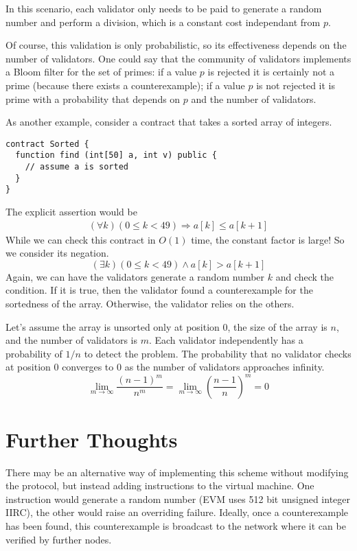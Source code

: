 \documentclass{article}
\begin{document}
In this scenario, each validator only needs to be paid to generate a random number and
perform a division, which is a constant cost independant from $p$.

Of course, this validation is only probabilistic, so its effectiveness depends on the
number of validators. One could say that the community of validators implements a Bloom
filter for the set of primes: if a value $p$ is rejected it is certainly not a prime (because
there exists a counterexample); if a value $p$ is not rejected it is prime with a
probability that depends on $p$ and the number of validators. 

As another example, consider a contract that takes a sorted array of integers.
\begin{lstlisting}[numbers=none]
contract Sorted {
  function find (int[50] a, int v) public {
    // assume a is sorted
  }
}
\end{lstlisting}
The explicit assertion would be
\begin{gather}\label{eq:1}
  (\forall k) (0\le k <49) \Rightarrow a[k] \le a[k+1]
\end{gather}
While we can check this contract in $O(1)$ time, the constant factor is large! So we
consider its negation.
\begin{displaymath}
  (\exists k) (0\le k <49) \wedge a[k] > a[k+1]
\end{displaymath}
Again, we can have the validators generate a random number $k$ and check the
condition. If it is true, then the validator found a counterexample for the sortedness
of the array. Otherwise, the validator relies on the others.

Let's assume the array is unsorted only at position $0$, the size of the array is $n$,
and the number of validators is $m$. Each validator independently has a probability of
$1/n$ to detect the problem. The probability that no validator checks at
position $0$ converges to $0$ as the number of validators approaches infinity.
\begin{displaymath}
  \lim_{m\to\infty}\frac{(n-1)^m}{n^m}
  = \lim_{m\to\infty} \left(\frac{n-1}{n}\right)^m
  = 0
\end{displaymath}

\section{Further Thoughts}
\label{sec:further-thoughts}

There may be an alternative way of implementing this scheme without modifying the
protocol, but instead adding instructions to the virtual machine. One instruction would
generate a random number (EVM uses 512 bit unsigned integer IIRC), the other would
raise an overriding failure. Ideally, once a counterexample has been found, this
counterexample is broadcast to the network where it can be verified by further nodes.
\end{document}
